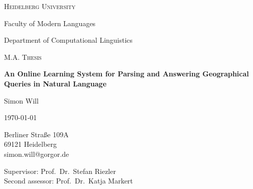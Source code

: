 \documentclass[12pt,a4paper,oneside,openright]{scrbook}
\begin{document}
\begin{titlepage}
  \centering\large
  {\scshape\LARGE
    Heidelberg University\par
    Faculty of Modern Languages\par
    Department of Computational Linguistics\par}
  \vspace{4em}
  {\scshape\Large M.A. Thesis\par}
  \vspace{2em}
  {\huge\bfseries An Online Learning System for Parsing and Answering
    Geographical Queries in Natural Language\par}
  \vspace{4em}
  {\Large
    Simon Will\par
    \today\par}
  \raggedright
  \vfill
  \vspace{4em}
  {\large
    Berliner Straße 109A\\
    69121 Heidelberg\\
    simon.will@gorgor.de\par}
  \vspace{1em}
  {\large
    Supervisor: Prof.~Dr.~Stefan Riezler\\
    Second assessor: Prof.~Dr.~Katja Markert}
\end{titlepage}

\frontmatter
\tableofcontents
\listoffigures
\listoftables

%

%

\mainmatter











%

%

%

\appendix

%



\backmatter

\printbibliography[nottype=online]

\printbibliography[type=online,title={Online Resources}]
\end{document}
